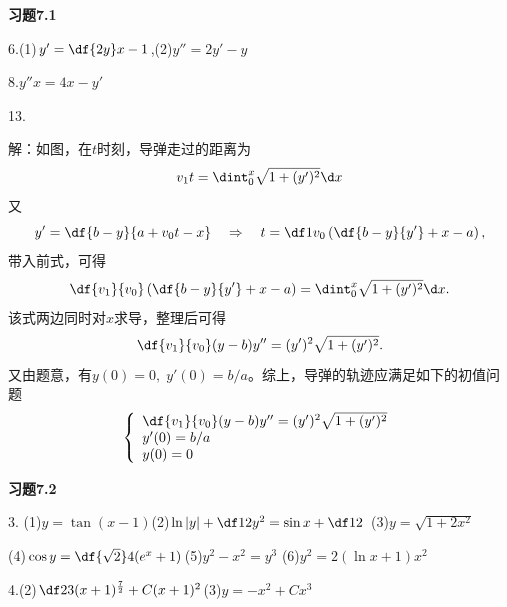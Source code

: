{\bf 习题7.1}

\bigskip

6.\;(1)$y'=\df{2y}x-1$,\quad (2)$y''=2y'-y$

\bigskip

8.\;$y''x=4x-y'$

\bigskip

13.

\begin{center}
\end{center}

解：如图，在$t$时刻，导弹走过的距离为
$$v_1t=\dint_0^x\sqrt{1+(y')^2}\d x$$
又
$$y'=\df{b-y}{a+v_0t-x}\quad\Rightarrow\quad
t=\df1{v_0}\left(\df{b-y}{y'}+x-a\right),$$
带入前式，可得
$$\df{v_1}{v_0}\left(\df{b-y}{y'}+x-a\right)=\dint_0^x\sqrt{1+(y')^2}\d
x.$$
该式两边同时对$x$求导，整理后可得
$$\df{v_1}{v_0}(y-b)y''=(y')^2\sqrt{1+(y')^2}.$$
又由题意，有$y(0)=0,\;y'(0)=b/a$。综上，导弹的轨迹应满足如下的初值问题
$$
\left\{\begin{array}{l}
\df{v_1}{v_0}(y-b)y''=(y')^2\sqrt{1+(y')^2}\\
y'(0)=b/a\\
y(0)=0
\end{array}
\right.
$$

\bigskip

{\bf 习题7.2}

\bigskip

3.\; (1)$y=\tan(x-1)$\quad (2)$\ln|y|+\df12y^2=\sin x+\df12$
\quad (3)$y=\sqrt{1+2x^2}$

\quad(4)$\cos y=\df{\sqrt2}4(e^x+1)$\quad(5)$y^2-x^2=y^3$
\quad(6)$y^2=2(\ln x+1)x^2$

\bigskip

4.\;(2)$\df23(x+1)^{\frac72}+C(x+1)^2$\quad(3)$y=-x^2+Cx^3$

